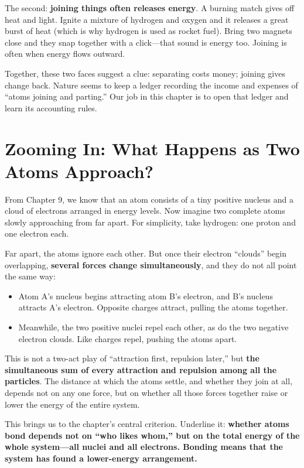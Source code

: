 The second: \textbf{joining things often releases energy}. A burning match gives off heat and light. Ignite a mixture of hydrogen and oxygen and it releases a great burst of heat (which is why hydrogen is used as rocket fuel). Bring two magnets close and they snap together with a click---that sound is energy too. Joining is often when energy flows outward.

Together, these two faces suggest a clue: separating costs money; joining gives change back. Nature seems to keep a ledger recording the income and expenses of ``atoms joining and parting.'' Our job in this chapter is to open that ledger and learn its accounting rules.

\section{Zooming In: What Happens as Two Atoms Approach?}

From Chapter 9, we know that an atom consists of a tiny positive nucleus and a cloud of electrons arranged in energy levels. Now imagine two complete atoms slowly approaching from far apart. For simplicity, take hydrogen: one proton and one electron each.

Far apart, the atoms ignore each other. But once their electron ``clouds'' begin overlapping, \textbf{several forces change simultaneously}, and they do not all point the same way:

\begin{itemize}[itemsep=2pt]
\item Atom A's nucleus begins attracting atom B's electron, and B's nucleus attracts A's electron. Opposite charges attract, pulling the atoms together.
\item Meanwhile, the two positive nuclei repel each other, as do the two negative electron clouds. Like charges repel, pushing the atoms apart.
\end{itemize}

This is not a two-act play of ``attraction first, repulsion later,'' but \textbf{the simultaneous sum of every attraction and repulsion among all the particles}. The distance at which the atoms settle, and whether they join at all, depends not on any one force, but on whether all those forces together raise or lower the energy of the entire system.

This brings us to the chapter's central criterion. Underline it: \textbf{whether atoms bond depends not on ``who likes whom,'' but on the total energy of the whole system---all nuclei and all electrons. Bonding means that the system has found a lower-energy arrangement.}

